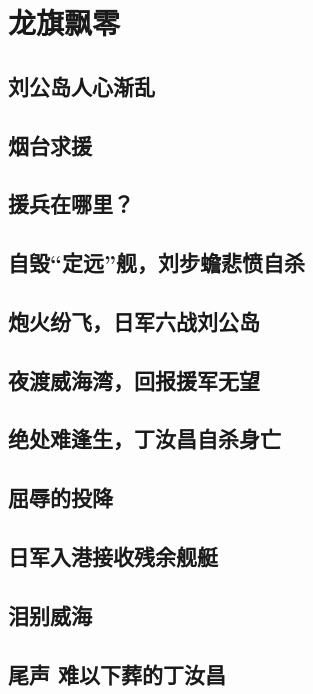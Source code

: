 \documentclass[12pt,UTF8]{ctexbook}
\begin{document}
\part{龙旗飘零}

\chapter{刘公岛人心渐乱}
\chapter{烟台求援}
\chapter{援兵在哪里？}
\chapter{自毁“定远”舰，刘步蟾悲愤自杀}
\chapter{炮火纷飞，日军六战刘公岛}
\chapter{夜渡威海湾，回报援军无望}
\chapter{绝处难逢生，丁汝昌自杀身亡}
\chapter{屈辱的投降}
\chapter{日军入港接收残余舰艇}
\chapter{泪别威海}

\backmatter

\chapter{尾声 难以下葬的丁汝昌}
\end{document}
